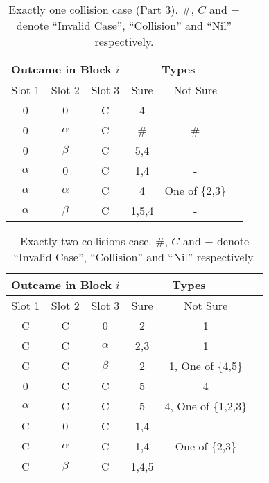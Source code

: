\documentclass[fleqn]{article}
\begin{document}
\begin {table} []
\centering
\begin{tabular}{|c|c|c|c|c|c|} 
\hline
\multicolumn{3}{|c|}{Outcame in Block $i$} & \multicolumn{2}{c|}{Types} \\ \hline
Slot 1        & Slot 2        & Slot 3     & Sure    & Not Sure         \\ \hline
0             & 0             & C          & 4       & -                \\ \hline
0             & $\alpha$      & C          & \#      & \#               \\ \hline
0             & $\beta$       & C          & 5,4     & -                \\ \hline
$\alpha$      & 0             & C          & 1,4     & -                \\ \hline
$\alpha$      & $\alpha$      & C          & 4       & One of \{2,3\}   \\ \hline
$\alpha$      & $\beta$       & C          & 1,5,4   & -                \\ \hline
\end{tabular}
\caption{Exactly one collision case (Part 3). \#, $C$ and $-$ denote ``Invalid Case'', ``Collision'' and  ``Nil'' respectively.}
\label{Tab_OneC3}
\end{table}

\begin {table} 
\centering
\begin{tabular}{|c|c|c|c|c|c|} 
\hline
\multicolumn{3}{|c|}{Outcame in Block $i$} & \multicolumn{2}{c|}{Types} \\ \hline
Slot 1       & Slot 2       & Slot 3       & Sure & Not Sure            \\ \hline
C            & C            & 0            & 2    & 1                   \\ \hline
C            & C            & $\alpha$     & 2,3  & 1                   \\ \hline
C            & C            & $\beta$      & 2    & 1, One of \{4,5\} \\ \hline
0            & C            & C            & 5    & 4                   \\ \hline
$\alpha$     & C            & C            & 5    & 4, One of \{1,2,3\} \\ \hline
C            & 0            & C            & 1,4  & -                   \\ \hline
C            & $\alpha$     & C            & 1,4  & One of \{2,3\}      \\ \hline
C            & $\beta$      & C            & 1,4,5  & -     \\ \hline

\end{tabular}
\caption{Exactly two collisions case. \#, $C$ and $-$ denote ``Invalid Case'', ``Collision'' and  ``Nil'' respectively.}
\label{Tab_TwoC1}
\end{table}
\end{document}
